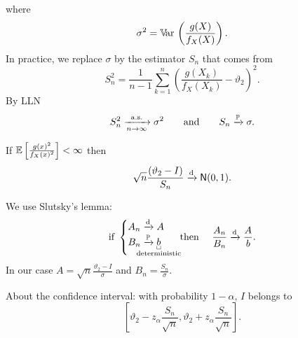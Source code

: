 \documentclass[12pt]{report}
\begin{document}
where
\begin{equation*}
	\sigma^{2}=\mathbb{V}\!\mathrm{ar}\,\left(\frac{g(X)}{f_X(X)}\right).
\end{equation*}
In practice, we replace $\sigma$ by the estimator $S_n$ that comes from
\begin{equation*}
	S_n^2=\frac{1}{n-1}\sum_{k=1}^{n}\left(\frac{g(X_k)}{f_X(X_k)}-\vartheta_2\right)^{2}.
\end{equation*}
By LLN
\begin{equation*}
	S_n^{2}\xrightarrow[n\to\infty]{\mathrm{a.s.}}\sigma^{2}\qquad\text{and}\qquad S_n\xrightarrow[]{\mathbb{P}}\sigma.
\end{equation*}
\begin{corollary}
	If $\mathbb{E}\left[\frac{g(x)^{2}}{f_X(x)^{2}}\right]<\infty$ then
	\begin{equation*}
		\sqrt{n}\frac{(\vartheta_2-I)}{S_n}\xrightarrow[]{\text{d}}\mathsf{N}(0,1).
	\end{equation*}
\end{corollary}
\begin{fancyproof}
	We use Slutsky's lemma:
	\begin{equation*}
		\text{if }\begin{cases}
			A_{n}\convd A\\
			B_{n}\convpr \ubracketthin{b}_{\claptext{deterministic}}
		\end{cases}\text{ then }\quad \frac{A_{n}}{B_{n}}\convd\frac{A}{b}.
	\end{equation*}
	In our case $A=\sqrt{n}\frac{\vartheta_2-I}{\sigma}$ and $B_{n}=\frac{S_{n}}{\sigma}$.
\end{fancyproof}
About the confidence interval: with probability $1-\alpha$, $I$ belongs to
\begin{equation*}
	\left[\vartheta_2-z_{\alpha}\frac{S_n}{\sqrt{n}},\vartheta_2+z_\alpha\frac{S_{n}}{\sqrt{n}}\right].
\end{equation*}
\end{document}
